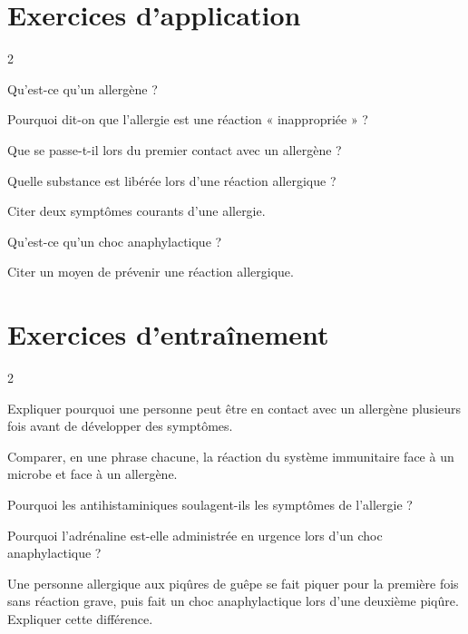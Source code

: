 \section{Exercices d'application}
\begin{multicols}{2}

\exo{} Qu'est-ce qu'un allergène ?

\exo{} Pourquoi dit-on que l'allergie est une réaction « inappropriée » ?

\exo{} Que se passe-t-il lors du premier contact avec un allergène ?

\exo{} Quelle substance est libérée lors d'une réaction allergique ?

\exo{} Citer deux symptômes courants d'une allergie.

\exo{} Qu'est-ce qu'un choc anaphylactique ?

\exo{} Citer un moyen de prévenir une réaction allergique.

\end{multicols}

\section{Exercices d'entraînement}
\begin{multicols}{2}

\exo{} Expliquer pourquoi une personne peut être en contact avec un allergène
plusieurs fois avant de développer des symptômes.

\exo{} Comparer, en une phrase chacune, la réaction du système immunitaire
face à un microbe et face à un allergène.

\exo{} Pourquoi les antihistaminiques soulagent-ils les symptômes de
l'allergie ?

\exo{} Pourquoi l'adrénaline est-elle administrée en urgence lors d'un choc
anaphylactique ?

\exo{} Une personne allergique aux piqûres de guêpe se fait piquer pour la
première fois sans réaction grave, puis fait un choc anaphylactique lors d'une
deuxième piqûre. Expliquer cette différence.

\end{multicols}

